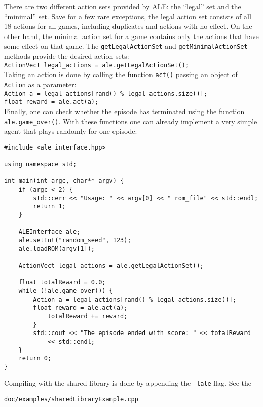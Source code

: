 \documentclass[12pt]{article}
\begin{document}
There are two different action sets provided by ALE: the ``legal'' set and the ``minimal'' 
set. Save for a few rare exceptions, the legal action set consists of all 18 actions for all games, including duplicates and actions with no effect. On the other hand, the minimal action set for a game contains only 
the actions that have some effect on that game. The \verb+getLegalActionSet+ and \verb+getMinimalActionSet+ methods provide the desired action sets:\\ 

\verb+ActionVect legal_actions = ale.getLegalActionSet();+\\

Taking an action is done by calling the function \verb+act()+ passing an object of \verb+Action+ as a parameter:\\

\verb+Action a = legal_actions[rand() % legal_actions.size()];+\\
\indent \verb+float reward = ale.act(a);+\\

Finally, one can check whether the episode has terminated using the function \verb+ale.game_over()+. With these 
functions one can already implement a very simple agent that plays randomly for one episode:

\begin{verbatim}
#include <ale_interface.hpp>

using namespace std;

int main(int argc, char** argv) {
    if (argc < 2) {
        std::cerr << "Usage: " << argv[0] << " rom_file" << std::endl;
        return 1;
    }

    ALEInterface ale;
    ale.setInt("random_seed", 123);
    ale.loadROM(argv[1]);

    ActionVect legal_actions = ale.getLegalActionSet();
    
    float totalReward = 0.0;
    while (!ale.game_over()) {
        Action a = legal_actions[rand() % legal_actions.size()];    
        float reward = ale.act(a);
            totalReward += reward;
        }
        std::cout << "The episode ended with score: " << totalReward 
            << std::endl;
    }
    return 0;
}
\end{verbatim}

Compiling with the shared library is done by appending the \verb+-lale+ flag. 
See the 

\begin{center} \verb+doc/examples/sharedLibraryExample.cpp+\end{center}
\end{document}
